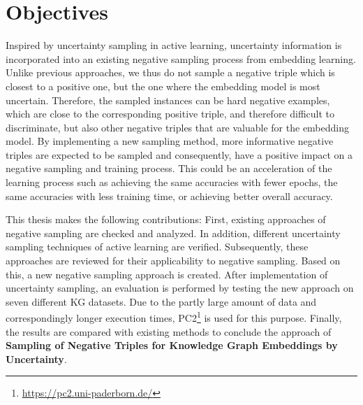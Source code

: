 \section{Objectives}
\label{sec:objectives}

Inspired by uncertainty sampling in active learning, uncertainty information is incorporated into an existing negative sampling process from embedding learning.
Unlike previous approaches, we thus do not sample a negative triple which is closest to a positive one, but the one where the embedding model is most uncertain.
Therefore, the sampled instances can be hard negative examples, which are close to the corresponding positive triple, and therefore difficult to discriminate, but also other negative triples that are valuable for the embedding model.
By implementing a new sampling method, more informative negative triples are expected to be sampled and consequently, have a positive impact on a negative sampling and training process.
This could be an acceleration of the learning process such as achieving the same accuracies with fewer epochs, the same accuracies with less training time, or achieving better overall accuracy.

This thesis makes the following contributions:
First, existing approaches of negative sampling are checked and analyzed.
In addition, different uncertainty sampling techniques of active learning are verified.
Subsequently, these approaches are reviewed for their applicability to negative sampling.
Based on this, a new negative sampling approach is created.
After implementation of uncertainty sampling, an evaluation is performed by testing the new approach on seven different \ac{KG} datasets.
Due to the partly large amount of data and correspondingly longer execution times, \ac{PC2}\footnote{\url{https://pc2.uni-paderborn.de/}} is used for this purpose.
Finally, the results are compared with existing methods to conclude the approach of \textbf{Sampling of Negative Triples for Knowledge Graph Embeddings by Uncertainty}.









